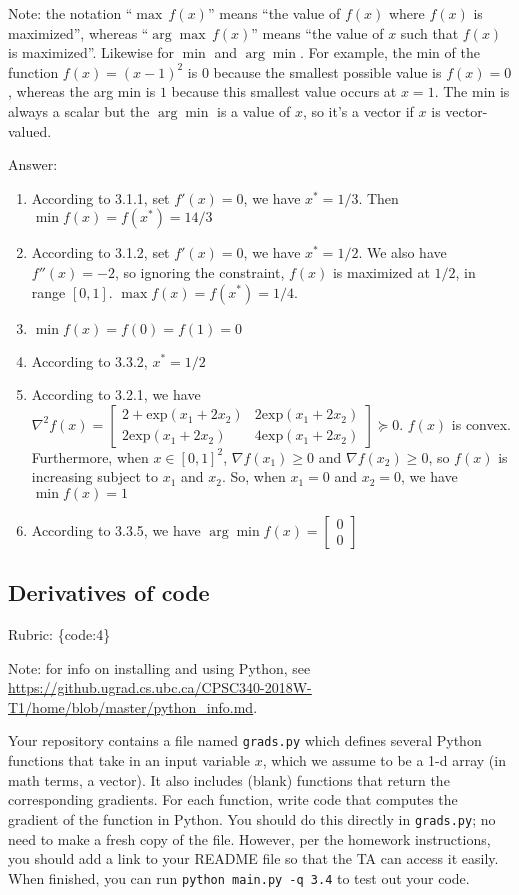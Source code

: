 \documentclass{article}
\def\rubric#1{\gre{Rubric: \{#1\}}}{}
\def\blu#1{{\color{blu}#1}}
\def\gre#1{{\color{gre}#1}}
\def\red#1{{\color{red}#1}}
\begin{document}
Note: the notation ``$\max \, f(x)$'' means ``the value of $f(x)$ where $f(x)$ is maximized'', whereas ``$\arg \max \, f(x)$'' means ``the value of $x$ such that $f(x)$ is maximized''.
Likewise for $\min$ and $\arg \min$. For example, the min of the function $f(x)=(x-1)^2$ is $0$ because the smallest possible value is $f(x)=0$,
whereas the arg min is $1$ because this smallest value occurs at $x=1$. The min is always a scalar but the $\arg \min$ is a value of $x$, so it's a vector
if $x$ is vector-valued.

\red{Answer:
\begin{enumerate}
\item According to 3.1.1, set $f'(x) = 0$, we have $x^* = 1/3$. Then $\min f(x) = f(x^*) = 14/3$
\item According to 3.1.2, set $f'(x)=0$, we have $x^* = 1/2$. We also have $f''(x) = -2$, so ignoring the constraint, $f(x)$ is maximized at $1/2$, in range $[0,1]$.
    $\max f(x) = f(x^*) = 1/4$.
\item $\min f(x) = f(0) = f(1)=0$
\item According to 3.3.2, $x^* = 1/2$
\item According to 3.2.1, we have
$\nabla^2f(x)=\left[\begin{array}{cc}
2+\text{exp}(x_1+2x_2) & 2\text{exp}(x_1+2x_2)\\
2\text{exp}(x_1+2x_2) & 4\text{exp}(x_1+2x_2)
\end{array}
\right]\succeq 0$. $f(x)$ is convex. Furthermore, when $x\in[0,1]^2$, $\nabla f(x_1)\geq 0$ and $\nabla f(x_2)\geq 0$, so $f(x)$ is increasing subject to $x_1$ and $x_2$.
So, when $x_1=0$ and $x_2=0$, we have $\min f(x) = 1$
\item According to 3.3.5, we have $\arg\min f(x) = \left[\begin{array}{c}
0\\0
\end{array}\right]$
\end{enumerate}
}
\subsection{Derivatives of code}

\rubric{code:4}

Note: for info on installing and using Python, see \\\url{https://github.ugrad.cs.ubc.ca/CPSC340-2018W-T1/home/blob/master/python_info.md}.

Your repository contains a file named \texttt{grads.py} which defines several Python functions that take in an input variable $x$, which we assume to be a 1-d array (in math terms, a vector).
It also includes (blank) functions that return the corresponding gradients.
For each function, \blu{write code that computes the gradient of the function} in Python.
You should do this directly in \texttt{grads.py}; no need to make a fresh copy of the file. However, per the homework instructions, you should add a link to your README file so that the TA can access it easily. When finished, you can run \texttt{python main.py -q 3.4} to test out your code.
\end{document}
